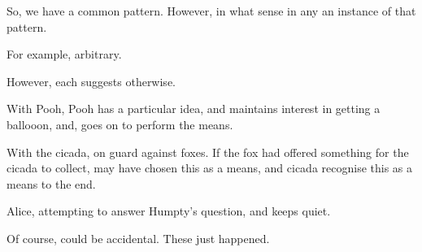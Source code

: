 \begin{note}
  So, we have a common pattern.
  However, in what sense in any  an instance of that pattern.

  For example, arbitrary.

  However, each  suggests otherwise.

  With Pooh, Pooh has a particular idea, and maintains interest in getting a ballooon, and, goes on to perform the means.

  With the cicada, on guard against foxes.
  If the fox had offered something for the cicada to collect, may have chosen this as a means, and cicada recognise this as a means to the end.

  Alice, attempting to answer Humpty's question, and keeps quiet.

  Of course, could be accidental.
  These  just happened.
\end{note}

